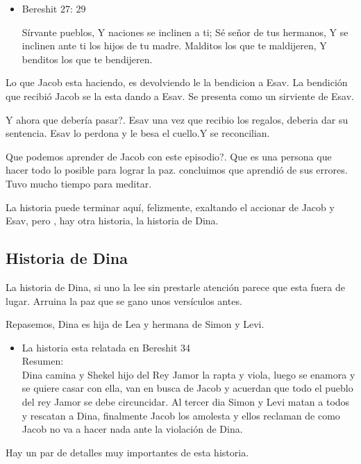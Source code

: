 \documentclass[conference]{IEEEtran}
\begin{document}
\begin{itemize}


\item Bereshit 27: 29

Sírvante pueblos,
Y naciones se inclinen a ti;
Sé señor de tus hermanos,
Y se inclinen ante ti los hijos de tu madre.
Malditos los que te maldijeren,
Y benditos los que te bendijeren.


\end{itemize}


Lo que Jacob esta haciendo, es devolviendo le la bendicion a Esav. La bendición que recibió Jacob se la esta dando a Esav. Se presenta como un sirviente de Esav.


Y ahora que debería pasar?. Esav una vez que recibio los regalos, deberia dar su sentencia. Esav lo perdona y le besa el cuello.Y se reconcilian.


Que podemos aprender de Jacob con este episodio?. Que es una persona que hacer todo lo posible para lograr la paz. 
concluimos que aprendió de sus errores. Tuvo mucho tiempo para meditar.


La historia puede terminar aquí, felizmente, exaltando el accionar de Jacob y Esav, pero , hay otra historia,  la historia de Dina.

\pagebreak
\subsection{Historia de Dina}
La historia de Dina, si uno la lee sin prestarle atención parece que esta fuera de lugar. Arruina la paz que se gano unos versículos antes.

Repasemos, Dina es hija de Lea y hermana de Simon y Levi.

\begin{itemize}
\item La historia esta relatada en Bereshit 34\\
Resumen:\\
Dina camina y Shekel hijo del Rey Jamor la rapta y viola, luego se enamora  
y se quiere casar con ella, van en busca de Jacob y acuerdan que todo el pueblo del rey Jamor se debe circuncidar.
Al tercer dia Simon y Levi matan a todos y rescatan a Dina, finalmente Jacob los amolesta y ellos reclaman de como Jacob no va a hacer nada ante la violación de Dina.
\end{itemize}

Hay un par de  detalles muy importantes de esta historia.
\end{document}
